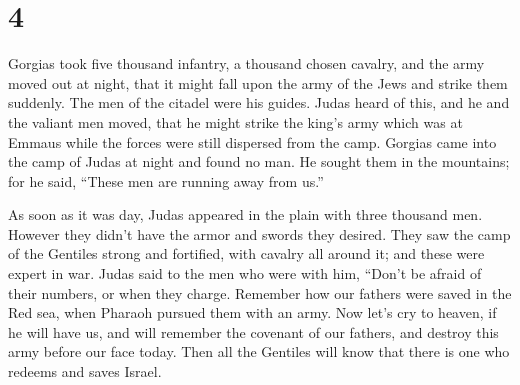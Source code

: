 \hypertarget{section-3}{%
\section{4}\label{section-3}}

 Gorgias took five thousand infantry, a thousand chosen
cavalry, and the army moved out at night,  that it might
fall upon the army of the Jews and strike them suddenly. The men of the
citadel were his guides.  Judas heard of this, and he and
the valiant men moved, that he might strike the king's army which was at
Emmaus  while the forces were still dispersed from the
camp.  Gorgias came into the camp of Judas at night and
found no man. He sought them in the mountains; for he said, ``These men
are running away from us.''

 As soon as it was day, Judas appeared in the plain with
three thousand men. However they didn't have the armor and swords they
desired.  They saw the camp of the Gentiles strong and
fortified, with cavalry all around it; and these were expert in war.
 Judas said to the men who were with him, ``Don't be
afraid of their numbers, or when they charge.  Remember
how our fathers were saved in the Red sea, when Pharaoh pursued them
with an army.  Now let's cry to heaven, if he will have
us, and will remember the covenant of our fathers, and destroy this army
before our face today.  Then all the Gentiles will know
that there is one who redeems and saves Israel.

